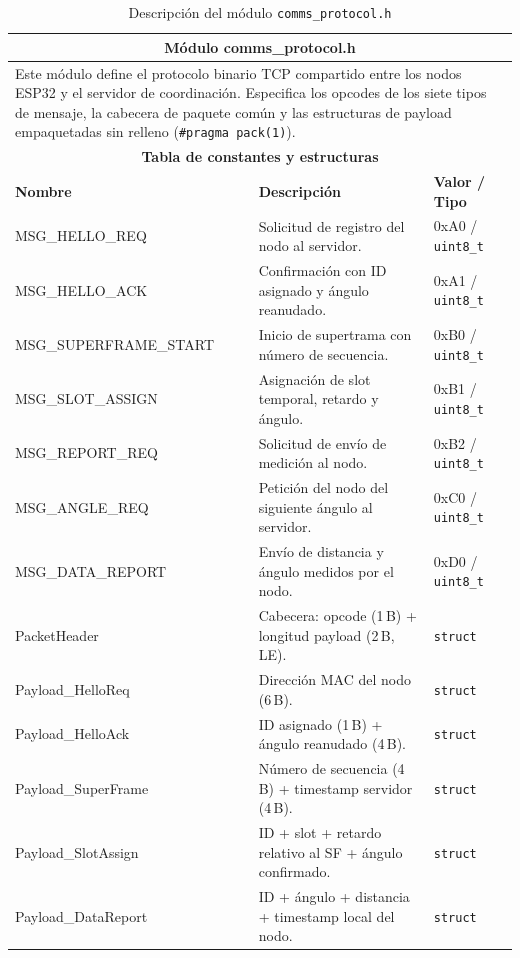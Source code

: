 \begin{table}[h!]
\centering
\small
\renewcommand{\arraystretch}{1.25}
\begin{tabular}{|p{3.2cm}|p{5.4cm}|p{4.5cm}|}
\hline
\multicolumn{3}{|c|}{\textbf{Módulo comms\_protocol.h}} \\
\hline
\multicolumn{3}{|p{13.1cm}|}{Este módulo define el protocolo binario TCP compartido
entre los nodos ESP32 y el servidor de coordinación. Especifica los opcodes de
los siete tipos de mensaje, la cabecera de paquete común y las estructuras de
payload empaquetadas sin relleno (\texttt{\#pragma pack(1)}).} \\
\hline
\multicolumn{3}{|c|}{\textbf{Tabla de constantes y estructuras}} \\
\hline
\textbf{Nombre} & \textbf{Descripción} & \textbf{Valor / Tipo} \\
\hline
MSG\_HELLO\_REQ & Solicitud de registro del nodo al servidor. & 0xA0 / \texttt{uint8\_t} \\
\hline
MSG\_HELLO\_ACK & Confirmación con ID asignado y ángulo reanudado. & 0xA1 / \texttt{uint8\_t} \\
\hline
MSG\_SUPERFRAME\_START & Inicio de supertrama con número de secuencia. & 0xB0 / \texttt{uint8\_t} \\
\hline
MSG\_SLOT\_ASSIGN & Asignación de slot temporal, retardo y ángulo. & 0xB1 / \texttt{uint8\_t} \\
\hline
MSG\_REPORT\_REQ & Solicitud de envío de medición al nodo. & 0xB2 / \texttt{uint8\_t} \\
\hline
MSG\_ANGLE\_REQ & Petición del nodo del siguiente ángulo al servidor. & 0xC0 / \texttt{uint8\_t} \\
\hline
MSG\_DATA\_REPORT & Envío de distancia y ángulo medidos por el nodo. & 0xD0 / \texttt{uint8\_t} \\
\hline
PacketHeader & Cabecera: opcode (1\,B) + longitud payload (2\,B, LE). & \texttt{struct} \\
\hline
Payload\_HelloReq & Dirección MAC del nodo (6\,B). & \texttt{struct} \\
\hline
Payload\_HelloAck & ID asignado (1\,B) + ángulo reanudado (4\,B). & \texttt{struct} \\
\hline
Payload\_SuperFrame & Número de secuencia (4\,B) + timestamp servidor (4\,B). & \texttt{struct} \\
\hline
Payload\_SlotAssign & ID + slot + retardo relativo al SF + ángulo confirmado. & \texttt{struct} \\
\hline
Payload\_DataReport & ID + ángulo + distancia + timestamp local del nodo. & \texttt{struct} \\
\hline
\end{tabular}
\caption{Descripción del módulo \texttt{comms\_protocol.h}}
\label{tab:module_protocol}
\end{table}

